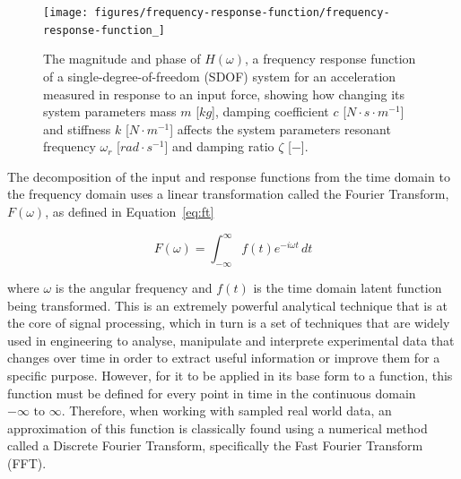 \documentclass[12pt]{article}
\begin{document}
    \begin{figure}[ht]
        \centering
        \texttt{[image: figures/frequency-response-function/frequency-response-function\_]}
        \caption{The magnitude and phase of $H(\omega)$, a frequency response function of a single-degree-of-freedom (SDOF) system for an acceleration measured in response to an input force, showing how changing its system parameters mass $m$ [$kg$], damping coefficient $c$ [$N \cdot s \cdot m^{-1}$] and stiffness $k$ [$N \cdot m^{-1}$] affects the system parameters resonant frequency $\omega_r$ [$rad \cdot s^{-1}$] and damping ratio $\zeta$ [$-$].}
        \label{fig:frequency-response-function}
    \end{figure}

    The decomposition of the input and response functions from the time domain to the frequency domain uses a linear transformation called the Fourier Transform, $F(\omega)$, as defined in Equation~\ref{eq:ft}

    \begin{equation}
        F(\omega) = \int_{-\infty}^{\infty} f(t) e^{-i \omega t} \, dt\label{eq:ft}
    \end{equation}


    \noindent where $\omega$ is the angular frequency and $f(t)$ is the time domain latent function being transformed.
    This is an extremely powerful analytical technique that is at the core of signal processing, which in turn is a set of techniques that are widely used in engineering to analyse, manipulate and interprete experimental data that changes over time in order to extract useful information or improve them for a specific purpose.
    However, for it to be applied in its base form to a function, this function must be defined for every point in time in the continuous domain $-\infty \text{ to } \infty$.
    Therefore, when working with sampled real world data, an approximation of this function is classically found using a numerical method called a Discrete Fourier Transform, specifically the Fast Fourier Transform (FFT).
\end{document}
